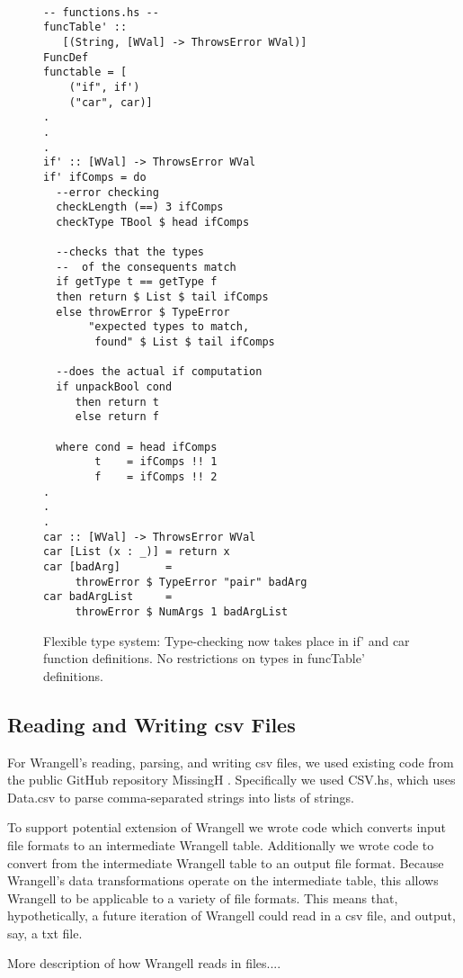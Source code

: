 \documentclass[preprint,nocopyrightspace]{sig-alternate}
\begin{document}
\begin{figure}
\caption{Flexible type system: Type-checking now takes place in if' and car function definitions. No restrictions on types in funcTable' definitions.}
\begin{lstlisting}

-- functions.hs --
funcTable' :: 
   [(String, [WVal] -> ThrowsError WVal)]
FuncDef
functable = [  
    ("if", if')
    ("car", car)]
.
.
.
if' :: [WVal] -> ThrowsError WVal 
if' ifComps = do
  --error checking
  checkLength (==) 3 ifComps
  checkType TBool $ head ifComps

  --checks that the types 
  --  of the consequents match
  if getType t == getType f
  then return $ List $ tail ifComps
  else throwError $ TypeError 
       "expected types to match, 
        found" $ List $ tail ifComps

  --does the actual if computation
  if unpackBool cond 
     then return t 
     else return f

  where cond = head ifComps
        t    = ifComps !! 1
        f    = ifComps !! 2
.
.
.
car :: [WVal] -> ThrowsError WVal
car [List (x : _)] = return x
car [badArg]       = 
     throwError $ TypeError "pair" badArg
car badArgList     = 
     throwError $ NumArgs 1 badArgList

\end{lstlisting} 
\label{fig:flexType}
\end{figure}

\subsection{Reading and Writing csv Files}
For Wrangell's reading, parsing, and writing csv files, we used  existing code from the public GitHub repository MissingH \cite{dataCSV}. Specifically we used CSV.hs, which uses Data.csv to parse comma-separated strings into lists of strings. 

To support potential extension of Wrangell we wrote code which converts input file formats to an intermediate Wrangell table. Additionally we wrote code to convert from the intermediate Wrangell table to an output file format. Because Wrangell's data transformations operate on the intermediate table, this allows Wrangell to be applicable to a variety of file formats. This means that, hypothetically, a future iteration of Wrangell could read in a csv file, and output, say, a txt file. 

More description of how Wrangell reads in files....  
\end{document}
